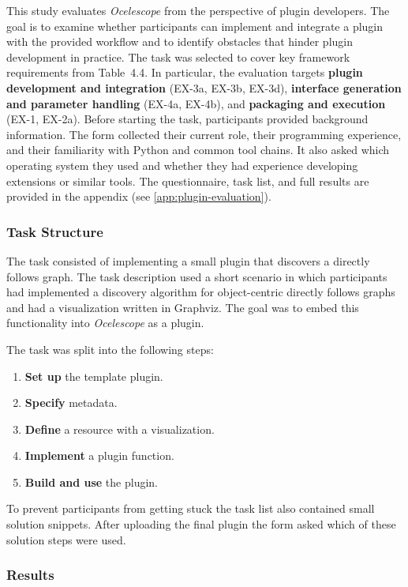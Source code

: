 This study evaluates \textit{Ocelescope} from the perspective of plugin developers.
The goal is to examine whether participants can implement and integrate a plugin with the provided workflow and to identify obstacles that hinder plugin development in practice.
The task was selected to cover key framework requirements from Table~4.4.
In particular, the evaluation targets \textbf{plugin development and integration} (EX-3a, EX-3b, EX-3d), \textbf{interface generation and parameter handling} (EX-4a, EX-4b), and \textbf{packaging and execution} (EX-1, EX-2a).
Before starting the task, participants provided background information.
The form collected their current role, their programming experience, and their familiarity with Python and common tool chains.
It also asked which operating system they used and whether they had experience developing extensions or similar tools.
The questionnaire, task list, and full results are provided in the appendix (see \autoref{app:plugin-evaluation}).

\subsubsection{Task Structure}

The task consisted of implementing a small plugin that discovers a directly follows graph.
The task description used a short scenario in which participants had implemented a discovery algorithm for object-centric directly follows graphs and had a visualization written in Graphviz.
The goal was to embed this functionality into \textit{Ocelescope} as a plugin.

The task was split into the following steps:

\begin{enumerate}
	\item \textbf{Set up} the template plugin.
	\item \textbf{Specify} metadata.
	\item \textbf{Define} a resource with a visualization.
	\item \textbf{Implement} a plugin function.
	\item \textbf{Build and use} the plugin.
\end{enumerate}

To prevent participants from getting stuck the task list also contained small solution snippets.
After uploading the final plugin the form asked which of these solution steps were used.

\subsubsection{Results}

